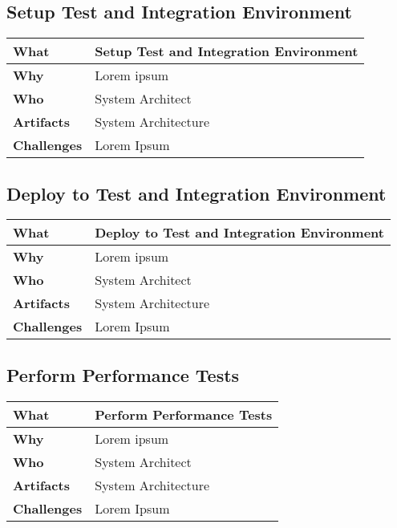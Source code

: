 \subsection{Setup Test and Integration Environment}
\begin{minipage}{\textwidth}
 \label{table:ch6_Task_Setup_Test_Environment}
\begin{tabular}
	{|m{3cm}|m{10cm}|} \hline \bfseries What & Setup Test and Integration Environment\\
	\hline \bfseries Why & Lorem ipsum\\
	\hline \bfseries Who & System Architect\\
	\hline \bfseries Artifacts & System Architecture\\
	\hline \bfseries Challenges & Lorem Ipsum\\
	\hline 
\end{tabular}
\end{minipage}

\subsection{Deploy to Test and Integration Environment}
\begin{minipage}{\textwidth}
 \label{table:ch6_Task_Deploy}
\begin{tabular}
	{|m{3cm}|m{10cm}|} \hline \bfseries What & Deploy to Test and Integration Environment\\
	\hline \bfseries Why & Lorem ipsum\\
	\hline \bfseries Who & System Architect\\
	\hline \bfseries Artifacts & System Architecture\\
	\hline \bfseries Challenges & Lorem Ipsum\\
	\hline 
\end{tabular}
\end{minipage}

\subsection{Perform Performance Tests}
\begin{minipage}{\textwidth}
 \label{table:ch6_Task_Perform_Performance_Tests}
\begin{tabular}
	{|m{3cm}|m{10cm}|} \hline \bfseries What & Perform Performance Tests\\
	\hline \bfseries Why & Lorem ipsum\\
	\hline \bfseries Who & System Architect\\
	\hline \bfseries Artifacts & System Architecture\\
	\hline \bfseries Challenges & Lorem Ipsum\\
	\hline 
\end{tabular}
\end{minipage}

